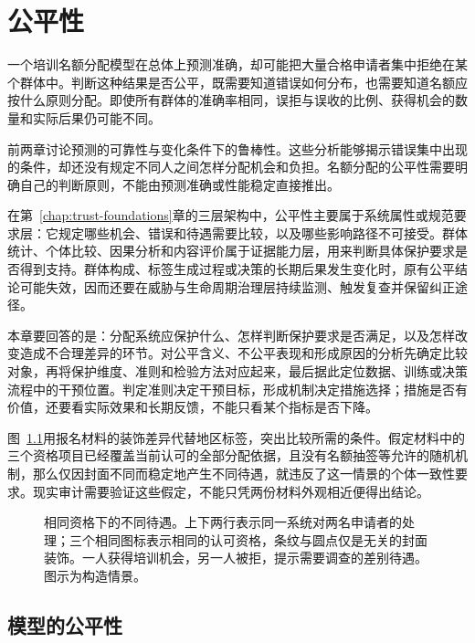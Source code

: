 \chapter{公平性}
\label{chap:trust-fairness}

一个培训名额分配模型在总体上预测准确，却可能把大量合格申请者集中拒绝在某个群体中。判断这种结果是否公平，既需要知道错误如何分布，也需要知道名额应按什么原则分配。即使所有群体的准确率相同，误拒与误收的比例、获得机会的数量和实际后果仍可能不同。

前两章讨论预测的可靠性与变化条件下的鲁棒性。这些分析能够揭示错误集中出现的条件，却还没有规定不同人之间怎样分配机会和负担。名额分配的公平性需要明确自己的判断原则，不能由预测准确或性能稳定直接推出。

在第~\ref{chap:trust-foundations}章的三层架构中，公平性主要属于系统属性或规范要求层：它规定哪些机会、错误和待遇需要比较，以及哪些影响路径不可接受。群体统计、个体比较、因果分析和内容评价属于证据能力层，用来判断具体保护要求是否得到支持。群体构成、标签生成过程或决策的长期后果发生变化时，原有公平结论可能失效，因而还要在威胁与生命周期治理层持续监测、触发复查并保留纠正途径。

本章要回答的是：分配系统应保护什么、怎样判断保护要求是否满足，以及怎样改变造成不合理差异的环节。对公平含义、不公平表现和形成原因的分析先确定比较对象，再将保护维度、准则和检验方法对应起来，最后据此定位数据、训练或决策流程中的干预位置。判定准则决定干预目标，形成机制决定措施选择；措施是否有价值，还要看实际效果和长期反馈，不能只看某个指标是否下降。

图~\ref{fig:trust-fairness-opportunity}用报名材料的装饰差异代替地区标签，突出比较所需的条件。假定材料中的三个资格项目已经覆盖当前认可的全部分配依据，且没有名额抽签等允许的随机机制，那么仅因封面不同而稳定地产生不同待遇，就违反了这一情景的个体一致性要求。现实审计需要验证这些假定，不能只凭两份材料外观相近便得出结论。

\begin{figure}[!htb]
  \centering
  \caption{相同资格下的不同待遇。上下两行表示同一系统对两名申请者的处理；三个相同图标表示相同的认可资格，条纹与圆点仅是无关的封面装饰。一人获得培训机会，另一人被拒，提示需要调查的差别待遇。图示为构造情景。}
  \label{fig:trust-fairness-opportunity}
\end{figure}

\section{模型的公平性}
\label{sec:fairness-concepts}

